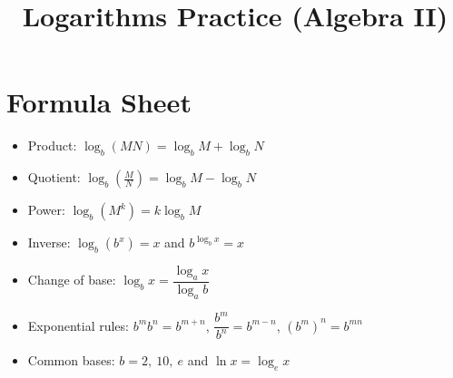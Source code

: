 \documentclass[12pt]{article}
\title{Logarithms Practice (Algebra II)}
\author{}
\date{}
\begin{document}
\maketitle

\section*{Formula Sheet}
\begin{itemize}[leftmargin=1.5em]
  \item Product: $\log_b(MN)=\log_b M+\log_b N$
  \item Quotient: $\log_b\!\left(\frac{M}{N}\right)=\log_b M-\log_b N$
  \item Power: $\log_b(M^k)=k\log_b M$
  \item Inverse: $\log_b(b^x)=x$ and $b^{\log_b x}=x$
  \item Change of base: $\log_b x=\dfrac{\log_a x}{\log_a b}$
  \item Exponential rules: $b^m b^n=b^{m+n}$, $\dfrac{b^m}{b^n}=b^{m-n}$, $(b^m)^n=b^{mn}$
  \item Common bases: $b=2,\ 10,\ e$ and $\ln x=\log_e x$
\end{itemize}
\end{document}
